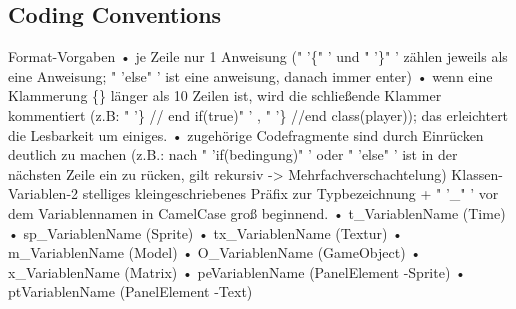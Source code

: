 \documentclass{article}
\begin{document}
\vspace{1cm}

\subsection{Coding Conventions}


Format-Vorgaben \newline
• je Zeile nur 1 Anweisung (" '\{" ' und " '\}" ' zählen jeweils als eine Anweisung; " 'else" ' ist eine
anweisung, danach immer enter) \newline
• wenn eine Klammerung \{\} länger als 10 Zeilen ist, wird die schließende Klammer
kommentiert (z.B: " '\} // end if(true)" ' , " '\} //end class(player)); das erleichtert die Lesbarkeit
um einiges.\newline
• zugehörige Codefragmente sind durch Einrücken deutlich zu machen (z.B.: nach
" 'if(bedingung)" ' oder " 'else" ' ist in der nächsten Zeile ein zu rücken, gilt rekursiv ->
Mehrfachverschachtelung)\newline
\newline
Klassen-Variablen-2 stelliges kleingeschriebenes Präfix zur Typbezeichnung + " '\_" ' vor dem Variablennamen in
CamelCase groß beginnend.\newline
• t\_VariablenName (Time)\newline
• sp\_VariablenName (Sprite)\newline
• tx\_VariablenName (Textur)\newline
• m\_VariablenName (Model)\newline
• O\_VariablenName (GameObject)\newline
• x\_VariablenName (Matrix)\newline
• peVariablenName (PanelElement -Sprite)\newline
• ptVariablenName (PanelElement -Text)\newline
\newline
\end{document}
